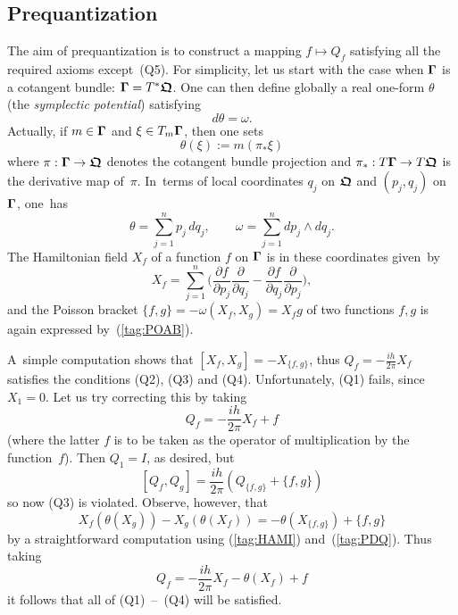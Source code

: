 \documentclass[12pt]{amsart}
\numberwithin{equation}{section}
\theoremstyle{remark}
\newcommand\Omg{{\bigam}}   %
\newcommand{\bigam}{\mbox{\boldmath $\Gamma$}}
\newcommand{\bfrakQ}{\mbox{\boldmath $\mathfrak Q$}}
\begin{document}
\subsection{Prequantization} \label{sec21}
The aim of prequantization is to construct a mapping $f\mapsto Q_f$ satisfying
all the required axioms except~(Q5). For simplicity, let us start with the case
when $\Omg$ is a cotangent bundle: $\Omg=T^*\bfrakQ$. One can then define
globally a real one-form $\theta$ (the {\it symplectic potential\/}) satisfying
\begin{equation}  d\theta=\omega.  \label{tag:SYMPOT}  \end{equation}
Actually, if $m\in \Omg$ and $\xi\in T_m\Omg$, then one sets
$$ \theta(\xi):= m(\pi_*\xi)  $$
where $\pi:\Omg\to\bfrakQ$ denotes the cotangent bundle projection and
$\pi_*:T\Omg\to T\bfrakQ$ is the derivative map of~$\pi$. In~terms of local
coordinates $q_j$ on $\bfrakQ$ and $(p_j,q_j)$ on~$\Omg$, one~has
\begin{equation}  \theta=\sum_{j=1}^n p_j\,dq_j, \qquad
\omega=\sum_{j=1}^n dp_j\wedge dq_j.  \label{tag:PDQ}  \end{equation}
The Hamiltonian field $X_f$ of a function $f$ on $\Omg$ is in these coordinates
given~by
\begin{equation}  X_f = \sum_{j=1}^n \Big( \frac{\partial f}{\partial p_j}
\frac{\partial}{\partial q_j} - \frac{\partial f}{\partial q_j}
\frac{\partial}{\partial p_j} \Big),   \label{tag:HAMI}  \end{equation}
and the Poisson bracket $\{f,g\}=- \omega(X_f,X_g)=X_f g$ of two functions
$f,g$ is again expressed by~(\ref{tag:POAB}).

A~simple computation shows that $[X_f,X_g]= - X_{\{f,g\}}$, thus
$Q_f=-\frac{ih}{2\pi} X_f$ satisfies the conditions (Q2), (Q3) and (Q4).
Unfortunately, (Q1) fails, since $X_1=0$. Let us try correcting this by taking
$$ Q_f = -\frac{ih}{2\pi} X_f +f  $$
(where the latter $f$ is to be taken as the operator of multiplication by the
function~$f$). Then $Q_1=I$, as desired, but
$$ [Q_f,Q_g] = \frac{ih}{2\pi} (Q_{\{f,g\}} + \{f,g\})  $$
so now (Q3) is violated. Observe, however, that
$$ X_f(\theta(X_g))-X_g(\theta(X_f)) = - \theta(X_{\{f,g\}})+\{f,g\}  $$
by a straightforward computation using (\ref{tag:HAMI}) and~(\ref{tag:PDQ}).
Thus taking
\begin{equation}  Q_f = -\frac{ih}{2\pi} X_f - \theta(X_f) + f
\label{tag:QFA}  \end{equation}
it follows that all of (Q1)~--~(Q4) will be satisfied.
\end{document}
